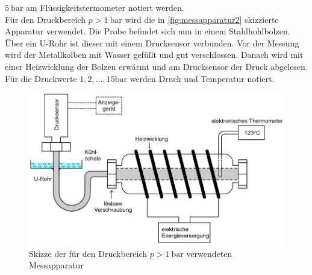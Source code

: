 $\SI{5}{\bar}$ am Flüssigkeitstermometer notiert werden.
\\
Für den Druckbereich $p > \SI{1}{\bar}$ wird die in \autoref{fig:messapparatur2}
skizzierte Apparatur verwendet. Die Probe befindet sich nun in einem Stahlhohlbolzen. Über
ein U-Rohr ist dieser mit einem Drucksensor verbunden. Vor der Messung wird der
Metallkolben mit Wasser gefüllt und gut verschlossen. Danach wird mit einer Heizwicklung
der Bolzen erwärmt und am Drucksensor der Druck abgelesen. Für die Druckwerte $1,2,
\hdots, 15 \si{\bar}$ werden Druck und Temperatur notiert.
\begin{figure}
	\centering
	\includegraphics[width=12cm]{images/messapparatur2.png}
	\caption{Skizze der für den Druckbereich $p > \SI{1}{\bar}$ verwendeten Messapparatur \cite{anleitung}}
	\label{fig:messapparatur2}
\end{figure}
